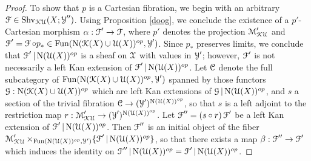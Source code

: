 \begin{proof}
To show that $p$ is a Cartesian fibration, we begin with an arbitrary
$\calF \in \Shv_{\calKU}(X; \calY'')$. Using Proposition \ref{doog}, we conclude the existence of a $p'$-Cartesian morphism $\alpha: \calF' \rightarrow \calF$, where $p'$ denotes the projection
$\calM'_{\calKU}$ and $\calF' = \calF \circ p_{\ast} \in
\Fun( \Nerve(\calK(X) \cup \calU(X))^{op}, \calY')$. Since $p_{\ast}$ preserves limits, we conclude that
$\calF' | \Nerve(\calU(X))^{op}$ is a sheaf on $\calX$ with values in $\calY'$; however,
$\calF'$ is not necessarily a left Kan extension of $\calF' | \Nerve(\calU(X))^{op}$. 
Let $\calC$ denote the full subcategory of $\Fun(\Nerve (\calK(X) \cup \calU(X))^{op}, \calY')$
spanned by those functors $\calG: \Nerve (\calK(X) \cup \calU(X))^{op}$ which are left Kan extensions of $\calG | \Nerve(\calU(X))^{op}$, and $s$ a section of the trivial fibration
$\calC \rightarrow (\calY')^{ \Nerve(\calU(X))^{op}}$, so that $s$ is a left adjoint to the
restriction map $r: \calM'_{\calKU} \rightarrow (\calY')^{ \Nerve(\calU(X))^{op} }$. 
Let $\calF'' = (s \circ r) \calF'$ be a left Kan extension of $\calF' | \Nerve(\calU(X))^{op}$. Then
$\calF''$ is an initial object of the fiber $\calM'_{\calKU} \times_{ \Fun(\Nerve(\calU(X))^{op}, \calY')}
\{ \calF' | \Nerve(\calU(X))^{op} \}$, so that there exists a map $\beta: \calF'' \rightarrow \calF'$
which induces the identity on $\calF'' | \Nerve(\calU(X))^{op} = \calF' | \Nerve(\calU(X))^{op}$. 


\end{proof}
